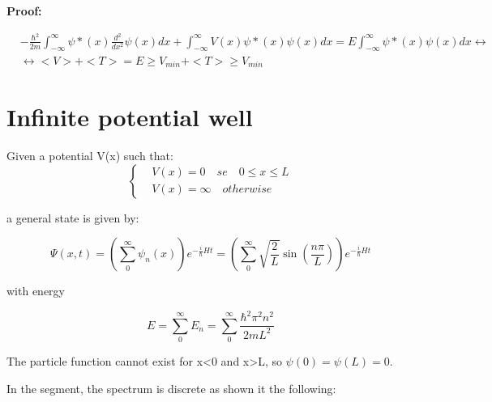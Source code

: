 \documentclass{report}
\begin{document}
\textbf{Proof:}

\begin{align*}
   & -\frac{\hbar^2}{2m}\int_{-\infty}^\infty \psi*(x)\frac{d^2}{dx^2} \psi(x)dx + \int_{-\infty}^\infty V(x)\psi*(x)\psi(x)dx = E\int_{-\infty}^\infty \psi*(x)\psi(x)dx \leftrightarrow \\
   & \leftrightarrow <V>+<T>=E\geq V_{min}+<T>\geq V_{min}
\end{align*}


\section{Infinite potential well}

\begin{tcolorbox}[colframe=gray!50, colback=gray!10, coltitle=black, title=Infinite potential well]
  Given a potential V(x) such that:
  \begin{equation}
    \left\{
    \begin{aligned}
       & V(x)=0 \quad se \quad 0\leq x\leq L \\
       & V(x)=\infty \quad otherwise
    \end{aligned}
    \right.
  \end{equation}

  a general state is given by:

  \begin{equation}
    \Psi(x,t)=\left(\sum_0^\infty \psi_n(x) \right)e^{-\frac{i}{\hbar}H t}= \left(\sum_0^\infty \sqrt{\frac{2}{L}}\sin\left(\frac{n \pi}{L}\right) \right)e^{-\frac{i}{\hbar}H t}
  \end{equation}

  with energy

  \begin{equation}
    E= \sum_0^\infty E_n= \sum_0^\infty \frac{\hbar^2 \pi^2 n^2}{2mL^2}
  \end{equation}

\end{tcolorbox}



The particle function cannot exist for x<0 and x>L, so $\psi(0)=\psi(L)=0$.

In the segment, the spectrum is discrete as shown it the following:
\end{document}
